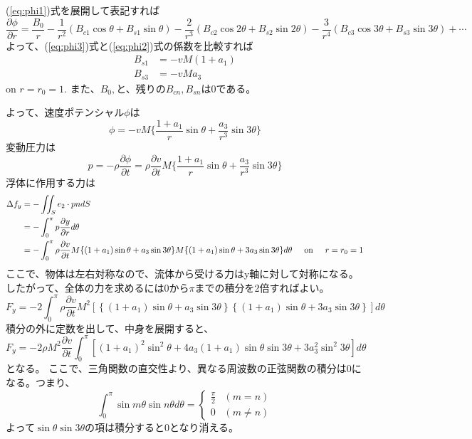 \documentclass[11pt, dvipdfmx]{jsarticle}
\begin{document}
(\ref{eq:phi1})式を展開して表記すれば
\begin{equation}
\frac{\partial \phi}{\partial r} = \frac{B_0}{r} -\frac{1}{r^2}(B_{c1}\cos \theta + B_{s1}\sin \theta) -\frac{2}{r^3}(B_{c2}\cos 2\theta + B_{s2}\sin 2\theta) -\frac{3}{r^4}(B_{c3}\cos 3\theta + B_{s3}\sin 3\theta) + \cdots
\label{eq:phi3}
\end{equation}
よって、(\ref{eq:phi3})式と(\ref{eq:phi2})式の係数を比較すれば
\begin{align*}
    B_{s1} &= -vM(1+a_1) \\
    B_{s3} &= -vMa_3
\end{align*}
on $r=r_0=1$.
また、$B_0, \text{と、残りの}B_{cn}, B_{sn}は0$である。

よって、速度ポテンシャル$\phi$は
$$
\phi = -vM\{\frac{1+a_1}{r}\sin \theta + \frac{a_3}{r^3}\sin 3\theta \}
$$
変動圧力は
$$
p = -\rho \frac{\partial \phi}{\partial t} = \rho \frac{\partial v}{\partial t} M\{\frac{1+a_1}{r}\sin \theta + \frac{a_3}{r^3}\sin 3\theta \}
$$
浮体に作用する力は\\
$$
\begin{aligned}
    \Delta f_y &= - \iint_S e_2\cdot p n dS\\
    &= -\int_0^\pi p \frac{\partial y}{\partial r}d\theta\\
    &= -\int_0^\pi \rho \frac{\partial v}{\partial t} M\{(1+a_1)\sin \theta + a_3\sin 3\theta \} M\{(1+a_1)\sin \theta + 3a_3\sin 3\theta \}d\theta \hspace{5mm}\text{on}\hspace{5mm}r=r_0=1\\
\end{aligned}
$$
ここで、物体は左右対称なので、流体から受ける力はy軸に対して対称になる。したがって、全体の力を求めるには$0$から$\pi$までの積分を2倍すればよい。
$$
F_y = -2\int_0^\pi \rho \frac{\partial v}{\partial t} M^2 \left[ \left\{ (1+a_1)\sin \theta + a_3\sin 3\theta \right\} \left\{ (1+a_1)\sin \theta + 3a_3\sin 3\theta \right\} \right] d\theta
$$
積分の外に定数を出して、中身を展開すると、
$$
F_y = -2 \rho M^2 \frac{\partial v}{\partial t} \int_0^\pi \left[ (1+a_1)^2\sin^2\theta + 4a_3(1+a_1)\sin\theta \sin3\theta + 3a_3^2\sin^2 3\theta \right] d\theta
$$
となる。
ここで、三角関数の直交性より、異なる周波数の正弦関数の積分は$0$になる。つまり、
$$
\int_0^\pi \sin m\theta \sin n\theta d\theta = 
\begin{cases}
    \frac{\pi}{2} & (m=n) \\
    0 & (m \neq n)
\end{cases}
$$
よって$\sin\theta\sin3\theta$の項は積分すると$0$となり消える。
\end{document}
